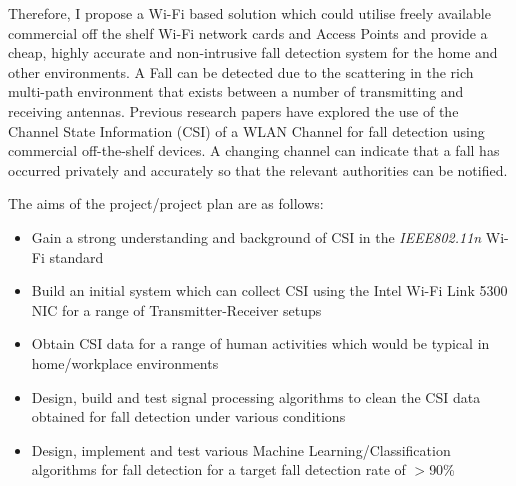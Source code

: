Therefore, I propose a Wi-Fi based solution which could utilise freely available commercial off the shelf Wi-Fi network cards and Access Points and provide a cheap, highly accurate and non-intrusive fall detection system for the home and other environments. A Fall can be detected due to the scattering in the rich multi-path environment that exists between a number of transmitting and receiving antennas. Previous research papers have explored the use of the Channel State Information (CSI) of a WLAN Channel for fall detection using commercial off-the-shelf devices. A changing channel can indicate that a fall has occurred privately and accurately so that the relevant authorities can be notified. \par
The aims of the project/project plan are as follows: 
\begin{itemize}[noitemsep, topsep=0pt]
\item Gain a strong understanding and background of CSI in the \textit{IEEE802.11n} Wi-Fi standard 
\item Build an initial system which can collect CSI using the Intel Wi-Fi Link 5300 NIC for a range of Transmitter-Receiver setups
\item Obtain CSI data for a range of human activities which would be typical in home/workplace environments
\item Design, build and test signal processing algorithms to clean the CSI data obtained for fall detection under various conditions
\item Design, implement and test various Machine Learning/Classification algorithms for fall detection for a target fall detection rate of $>$90\%
\end{itemize}
